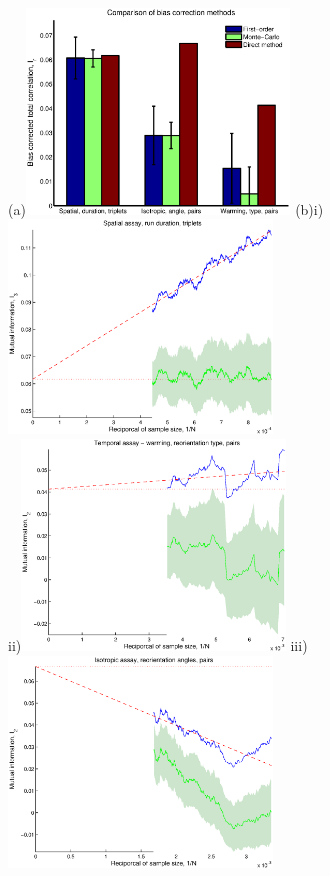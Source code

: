 \documentclass[12pt]{article}
\begin{document}
\begin{figure}
  \begin{center}
    (a)\includegraphics[width=7cm]{comparison.eps}
    (b)i)\includegraphics[width=7cm]{spat_dur_3.eps}\\
    ii)\includegraphics[width=7cm]{warm_typ_2.eps}
    iii)\includegraphics[width=7cm]{iso_ang_2.eps}
  \end{center}

\end{figure}
\end{document}
